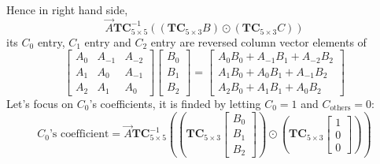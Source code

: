 \documentclass[
11pt,notheorems,hyperref={pdfauthor=whatever}
]{beamer}
\begin{document}
\begin{frame}
    Hence in right hand side,
    \[
    \vec{A} \mathbf{TC}_{5\times 5}^{-1} \left(\left(\mathbf{TC}_{5\times 3}B\right)\odot \left(\mathbf{TC}_{5\times 3}C\right)\right)
    \]
    its $C_0$ entry, $C_1$ entry and $C_2$ entry are reversed column vector elements of 
    \[
    \begin{bmatrix}
        A_{0} & A_{-1} & A_{-2}\\
        A_{1} & A_{0} & A_{-1}\\
        A_{2} & A_{1} & A_{0}
    \end{bmatrix}
    \begin{bmatrix}
        B_{0} \\ B_{1} \\ B_{2}
    \end{bmatrix}
    =
    \begin{bmatrix}
        A_{0}B_{0} + A_{-1}B_{1} + A_{-2}B_{2}\\
        A_{1}B_{0} + A_{0}B_{1} + A_{-1}B_{2}\\
        A_{2}B_{0} + A_{1}B_{1} + A_{0}B_{2}
    \end{bmatrix}
    \]
    Let's focus on $C_0$'s coefficients, it is finded by letting $C_0=1$ and $C_\text{others}=0$:
    \[
    C_{0}\text{'s coefficient} = \vec{A} \mathbf{TC}_{5\times 5}^{-1} \left(\left(\mathbf{TC}_{5\times 3}\begin{bmatrix}B_{0}\\B_{1}\\B_{2}\end{bmatrix}\right)\odot \left(\mathbf{TC}_{5\times 3}\begin{bmatrix}1\\0\\0\end{bmatrix}\right)\right)
    \]
\end{frame}
\end{document}
